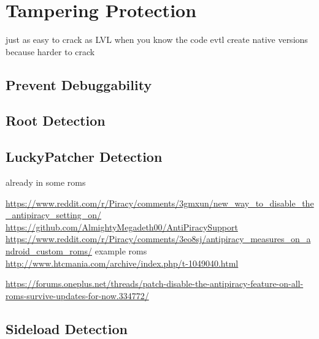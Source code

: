 \section{Tampering Protection} \label{section:evaluation-tampering}












just as easy to crack as LVL when you know the code\newline
evtl create native versions because harder to crack\newline

\subsection{Prevent Debuggability} \label{subsection:tampering-debuggable}
\subsection{Root Detection} \label{subsection:tampering-root}
\subsection{LuckyPatcher Detection} \label{subsection:tampering-luckypatcher}
already in some roms

 \url{https://www.reddit.com/r/Piracy/comments/3gmxun/new_way_to_disable_the_antipiracy_setting_on/}\newline
\url{https://github.com/AlmightyMegadeth00/AntiPiracySupport}\newline
\url{https://www.reddit.com/r/Piracy/comments/3eo8sj/antipiracy_measures_on_android_custom_roms/}\newline
example roms \url{http://www.htcmania.com/archive/index.php/t-1049040.html}\newline

\url{https://forums.oneplus.net/threads/patch-disable-the-antipiracy-feature-on-all-roms-survive-updates-for-now.334772/}
\subsection{Sideload Detection} \label{subsection:tampering-sideload}
